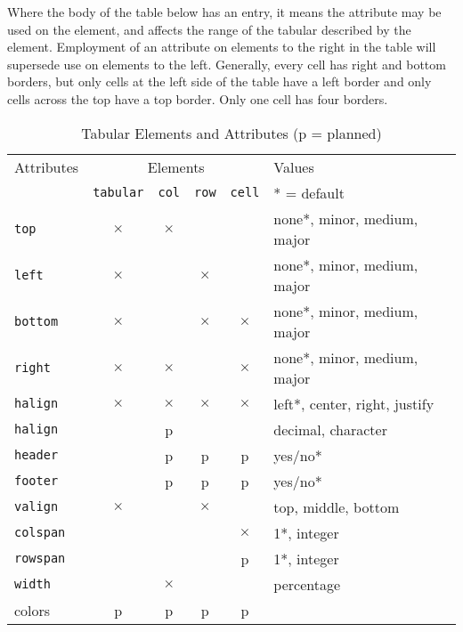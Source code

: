 \documentclass[10pt,]{article}
\theoremstyle{plain}
\theoremstyle{definition}
\theoremstyle{definition}
\theoremstyle{definition}
\theoremstyle{definition}
\theoremstyle{definition}
\theoremstyle{definition}
\numberwithin{equation}{section}
\newcommand{\hrulemedium}{\noalign{\hrule height 0.07em}}
\newcommand{\hrulethick} {\noalign{\hrule height 0.11em}}
\begin{document}
\par
\hypertarget{p-439}{}%
Where the body of the table below has an entry, it means the attribute may be used on the element, and affects the range of the tabular described by the element.  Employment of an attribute on elements to the right in the table will supersede use on elements to the left.  Generally, every cell has right and bottom borders, but only cells at the left side of the table have a left border and only cells across the top have a top border.  Only one cell has four borders.%
\begin{table}
\centering
\begin{tabular}{lccccl}\hrulethick
Attributes&\multicolumn{4}{c}{Elements}&Values\tabularnewline[0pt]
&\lstinline?tabular?&\lstinline?col?&\lstinline?row?&\lstinline?cell?&* = default\tabularnewline\hrulemedium
\lstinline?top?&\(\times\)&\(\times\)&&&none*, minor, medium, major\tabularnewline[0pt]
\lstinline?left?&\(\times\)&&\(\times\)&&none*, minor, medium, major\tabularnewline[0pt]
\lstinline?bottom?&\(\times\)&&\(\times\)&\(\times\)&none*, minor, medium, major\tabularnewline[0pt]
\lstinline?right?&\(\times\)&\(\times\)&&\(\times\)&none*, minor, medium, major\tabularnewline[0pt]
\lstinline?halign?&\(\times\)&\(\times\)&\(\times\)&\(\times\)&left*, center, right, justify\tabularnewline[0pt]
\lstinline?halign?&&p&&&decimal, character\tabularnewline[0pt]
\lstinline?header?&&p&p&p&yes/no*\tabularnewline[0pt]
\lstinline?footer?&&p&p&p&yes/no*\tabularnewline[0pt]
\lstinline?valign?&\(\times\)&&\(\times\)&&top, middle, bottom\tabularnewline[0pt]
\lstinline?colspan?&&&&\(\times\)&1*, integer\tabularnewline[0pt]
\lstinline?rowspan?&&&&p&1*, integer\tabularnewline[0pt]
\lstinline?width?&&\(\times\)&&&percentage\tabularnewline[0pt]
colors&p&p&p&p&
\end{tabular}
\caption{Tabular Elements and Attributes (p = planned)\label{table-5}}
\end{table}
\typeout{************************************************}
\typeout{************************************************}
\end{document}

